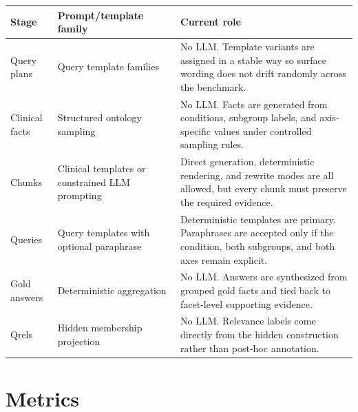 \documentclass[11pt,a4paper]{article}
\begin{document}
\begingroup
\renewcommand{\arraystretch}{1.2}
\begin{center}
	\begin{tabular}{@{}p{3.0cm}p{3.6cm}p{7.8cm}@{}}
		\toprule
		\textbf{Stage} & \textbf{Prompt/template family} & \textbf{Current role} \\
		\midrule
		Query plans & Query template families & No LLM. Template variants are assigned in a stable way so surface wording does not drift randomly across the benchmark. \\
		Clinical facts & Structured ontology sampling & No LLM. Facts are generated from conditions, subgroup labels, and axis-specific values under controlled sampling rules. \\
		Chunks & Clinical templates or constrained LLM prompting & Direct generation, deterministic rendering, and rewrite modes are all allowed, but every chunk must preserve the required evidence. \\
		Queries & Query templates with optional paraphrase & Deterministic templates are primary. Paraphrases are accepted only if the condition, both subgroups, and both axes remain explicit. \\
		Gold answers & Deterministic aggregation & No LLM. Answers are synthesized from grouped gold facts and tied back to facet-level supporting evidence. \\
		Qrels & Hidden membership projection & No LLM. Relevance labels come directly from the hidden construction rather than post-hoc annotation. \\
		\bottomrule
	\end{tabular}
\end{center}
\endgroup

\section{Metrics}
\end{document}
